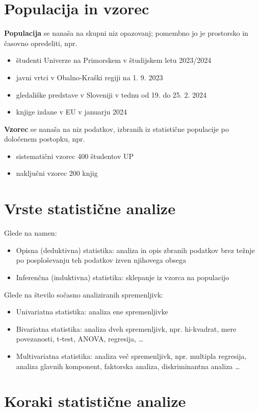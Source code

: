 \section{Populacija in vzorec}

\textbf{Populacija} se nanaša na skupni niz opazovanj; pomembno jo je prostorsko in časovno opredeliti, npr.
\begin{itemize}
\item študenti Univerze na Primorskem v študijskem letu 2023/2024
\item javni vrtci v Obalno-Kraški regiji na 1. 9. 2023
\item gledališke predstave v Sloveniji v tednu od 19. do 25. 2. 2024
\item knjige izdane v EU v januarju 2024
\end{itemize}
\textbf{Vzorec} se nanaša na niz podatkov, izbranih iz statistične populacije po določenem postopku, npr.
\begin{itemize}
\item sistematični vzorec 400 študentov UP
\item naključni vzorec 200 knjig
\end{itemize}

\section{Vrste statistične analize}

Glede na namen:
\begin{itemize}
\item Opisna (deduktivna) statistika: analiza in opis zbranih podatkov brez težnje po posploševanju teh podatkov izven njihovega obsega
\item Inferenčna (induktivna) statistika: sklepanje iz vzorca na populacijo
\end{itemize}
Glede na število sočasno analiziranih spremenljivk:
\begin{itemize}
\item Univariatna statistika: analiza ene spremenljivke
\item Bivariatna statistika: analiza dveh spremenljivk, npr. hi-kvadrat, mere povezanosti, t-test, ANOVA, regresija, …
\item Multivariatna statistika: analiza več spremenljivk, npr. multipla regresija, analiza glavnih komponent, faktorska analiza, diskriminantna analiza …
\end{itemize}

\section{Koraki statistične analize}

